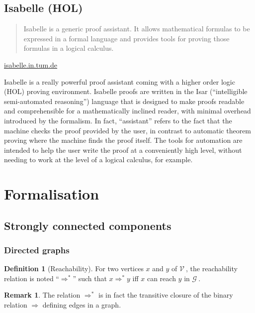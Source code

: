 \documentclass[a4 paper, 12pt]{article}
\theoremstyle{definition}
\def\GG{$\mathcal{G}~$}
\def\VV{$\mathcal{V}~$}
\newtheorem{definition}{Definition}
\newtheorem{remark}{Remark}
\begin{document}
\subsection{Isabelle (HOL)}
\begin{quote}
    Isabelle is a generic proof assistant. It allows mathematical formulas to be expressed in a formal language and provides tools for proving those formulas in a logical calculus.
\end{quote}
\begin{flushright}
    \href{https://isabelle.in.tum.de/}{isabelle.in.tum.de}
\end{flushright}
Isabelle is a really powerful proof assistant coming with a higher order logic (HOL) proving environment. Isabelle proofs are written in the Isar (``intelligible semi-automated reasoning'') language that is designed to make proofs readable and comprehensible for a mathematically inclined reader, with minimal overhead introduced by the formalism. In fact, ``assistant'' refers to the fact that the machine checks the proof provided by the user, in contrast to automatic theorem proving where the machine finds the proof itself. The tools for automation are intended to help the user write the proof at a conveniently high level, without needing to work at the level of a logical calculus, for example.

\pagebreak

\section{Formalisation}
\subsection{Strongly connected components}
\subsubsection{Directed graphs}\label{sec:directedgraphs}

\begin{definition}[Reachability]
    For two vertices $x$ and $y$ of \VV, the reachability relation is noted ``$\Rightarrow^*$'' such that $x \Rightarrow^* y$ iff $x$ can reach $y$ in \GG.
\end{definition}

\begin{remark}
    The relation $\Rightarrow^*$ is in fact the transitive closure of the binary relation $\Rightarrow$ defining edges in a graph.
\end{remark}
\end{document}
